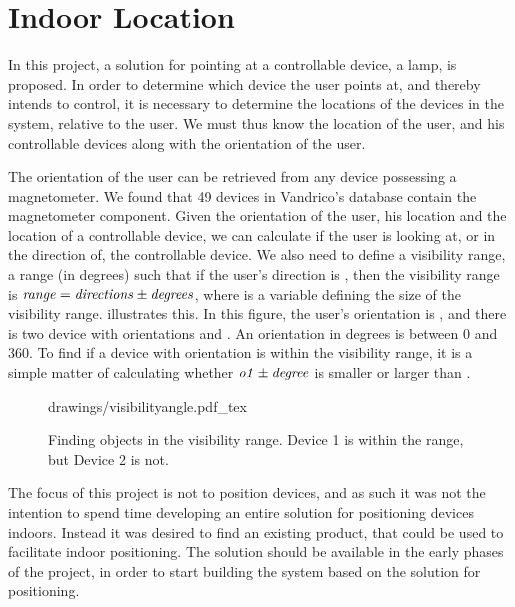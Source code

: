 \section{Indoor Location}\label{sec:designindoorlocation}

In this project, a solution for pointing at a controllable device, \eg a lamp, is proposed. 
In order to determine which device the user points at, 
and thereby intends to control, 
it is necessary to determine the locations of the devices in the system, 
relative to the user. 
We must thus know the location of the user, 
and his controllable devices along with the orientation of the user.

The orientation of the user can be retrieved from any device possessing a magnetometer. 
We found that 49 devices in Vandrico's database contain the magnetometer component. 
Given the orientation of the user, his location and the location of a controllable device, 
we can calculate if the user is looking at, 
or in the direction of, the controllable device. 
We also need to define a visibility range, 
\ie a range (in degrees) such that if the user's direction is , 
then the visibility range  is $\var{range} = \var{directions} \pm \var{degrees}$, 
where  is a variable defining the size of the visibility range. 
 illustrates this. 
In this figure, the user's orientation is , 
and there is two device with orientations  and . 
An orientation in degrees is between \num{0} and \num{360}. 
To find if a device with orientation  is within the visibility range, 
it is a simple matter of calculating whether $\var{o1} \pm \var{degree}$ is smaller or larger than .

\begin{figure}[!htb]
    \centering
    \def\svgwidth{0.6\textwidth}
    {drawings/visibilityangle.pdf_tex}
    \caption{Finding objects in the visibility range. Device 1 is within the range, but Device 2 is not.}
    \label{fig:visibilityangle}
\end{figure}

The focus of this project is not to position devices, 
and as such it was not the intention to spend time developing an entire solution for positioning devices indoors. 
Instead it was desired to find an existing product, 
that could be used to facilitate indoor positioning.
The solution should be available in the early phases of the project, 
in order to start building the system based on the solution for positioning.


